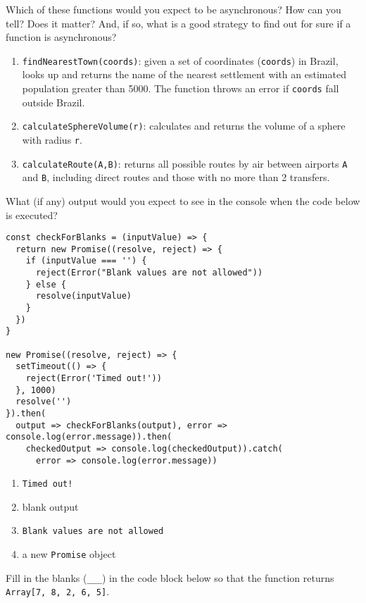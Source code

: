 Which of these functions would you expect to be asynchronous?
How can you tell?
Does it matter?
And, if so, what is a good strategy to find out for sure if a function is asynchronous?

\begin{enumerate}
\item
  \texttt{findNearestTown(coords)}: given a set of coordinates (\texttt{coords}) in Brazil,
  looks up and returns the name of the nearest settlement with an estimated population greater than 5000.
  The function throws an error if \texttt{coords} fall outside Brazil.
\item
  \texttt{calculateSphereVolume(r)}: calculates and returns the volume of a sphere with radius \texttt{r}.
\item
  \texttt{calculateRoute(A,B)}: returns all possible routes by air between airports \texttt{A} and \texttt{B},
  including direct routes and those with no more than 2 transfers.
\end{enumerate}


What (if any) output would you expect to see in the console
when the code below is executed?

\begin{verbatim}
const checkForBlanks = (inputValue) => {
  return new Promise((resolve, reject) => {
    if (inputValue === '') {
      reject(Error("Blank values are not allowed"))
    } else {
      resolve(inputValue)
    }
  })
}

new Promise((resolve, reject) => {
  setTimeout(() => {
    reject(Error('Timed out!'))
  }, 1000)
  resolve('')
}).then(
  output => checkForBlanks(output), error => console.log(error.message)).then(
    checkedOutput => console.log(checkedOutput)).catch(
      error => console.log(error.message))
\end{verbatim}

\begin{enumerate}
\item
  \texttt{Timed\ out!}
\item
  blank output
\item
  \texttt{Blank\ values\ are\ not\ allowed}
\item
  a new \texttt{Promise} object
\end{enumerate}


Fill in the blanks (\texttt{\_\_\_}) in the code block below so that
the function returns \texttt{Array[7,\ 8,\ 2,\ 6,\ 5]}.

